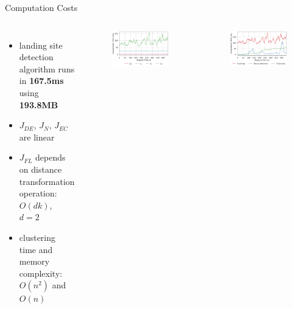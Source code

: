\documentclass[10pt]{beamer}
\begin{document}
    \begin{frame}{Computation Costs}
        \begin{columns}[c,onlytextwidth]
                \begin{itemize}
                    \item landing site detection algorithm runs in
                        \textbf{167.5ms} using \textbf{193.8MB}
                    \item $J_{DE}$, $J_N$, $J_{EC}$ are linear
                    \item $J_{FL}$ depends on distance transformation
                        operation: $O(dk)$, $d=2$
                    \item clustering time and memory complexity:
                        $O(n^2)$ and $O(n)$
                \end{itemize}

                \vspace{0.4cm}
                \begin{figure}
                    \centering
                    \includegraphics[width=\textwidth]{images/Fig8a.png}
                \end{figure}
                \vspace{-0.8cm}
                \begin{figure}
                    \centering
                    \includegraphics[width=\textwidth]{images/Fig8b.png}
                \end{figure}
        \end{columns}
    \end{frame}
\end{document}
